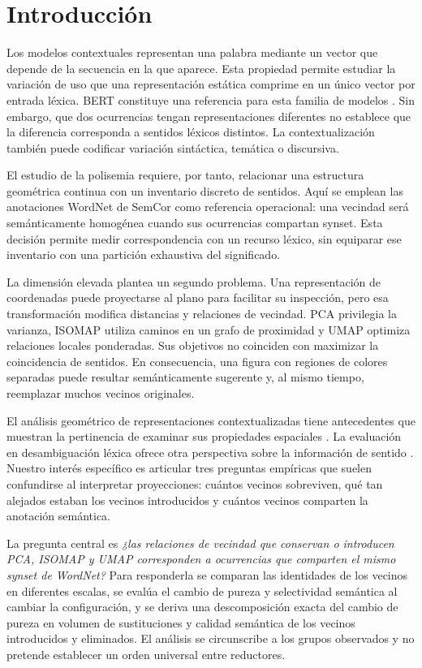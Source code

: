 \section{Introducción}
Los modelos contextuales representan una palabra mediante un vector que depende de la secuencia en la que aparece. Esta propiedad permite estudiar la variación de uso que una representación estática comprime en un único vector por entrada léxica. BERT constituye una referencia para esta familia de modelos \parencite{devlin2019}. Sin embargo, que dos ocurrencias tengan representaciones diferentes no establece que la diferencia corresponda a sentidos léxicos distintos. La contextualización también puede codificar variación sintáctica, temática o discursiva.

El estudio de la polisemia requiere, por tanto, relacionar una estructura geométrica continua con un inventario discreto de sentidos. Aquí se emplean las anotaciones WordNet de SemCor como referencia operacional: una vecindad será semánticamente homogénea cuando sus ocurrencias compartan synset. Esta decisión permite medir correspondencia con un recurso léxico, sin equiparar ese inventario con una partición exhaustiva del significado.

La dimensión elevada plantea un segundo problema. Una representación de  coordenadas puede proyectarse al plano para facilitar su inspección, pero esa transformación modifica distancias y relaciones de vecindad. PCA privilegia la varianza, ISOMAP utiliza caminos en un grafo de proximidad y UMAP optimiza relaciones locales ponderadas. Sus objetivos no coinciden con maximizar la coincidencia de sentidos. En consecuencia, una figura con regiones de colores separadas puede resultar semánticamente sugerente y, al mismo tiempo, reemplazar muchos vecinos originales.

El análisis geométrico de representaciones contextualizadas tiene antecedentes que muestran la pertinencia de examinar sus propiedades espaciales \parencite{ethayarajh2019}. La evaluación en desambiguación léxica ofrece otra perspectiva sobre la información de sentido \parencite{hadiwinoto2019}. Nuestro interés específico es articular tres preguntas empíricas que suelen confundirse al interpretar proyecciones: cuántos vecinos sobreviven, qué tan alejados estaban los vecinos introducidos y cuántos vecinos comparten la anotación semántica.

La pregunta central es \emph{¿las relaciones de vecindad que conservan o introducen PCA, ISOMAP y UMAP corresponden a ocurrencias que comparten el mismo synset de WordNet?} Para responderla se comparan las identidades de los vecinos en diferentes escalas, se evalúa el cambio de pureza y selectividad semántica al cambiar la configuración, y se deriva una descomposición exacta del cambio de pureza en volumen de sustituciones y calidad semántica de los vecinos introducidos y eliminados. El análisis se circunscribe a los grupos observados y no pretende establecer un orden universal entre reductores.
